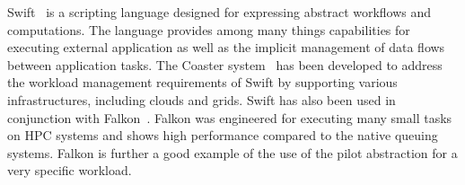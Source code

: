 \documentclass{sig-alternate}
\begin{document}
Swift~\cite{Wilde2011} is a scripting language designed for expressing
abstract workflows and computations.
The language provides among many things capabilities for executing external
application as well as the implicit management of data flows between
application tasks.
The Coaster system~\cite{coasters} has been developed to address the workload
management requirements of Swift by supporting various infrastructures,
including clouds and grids.
Swift has also been used in conjunction with Falkon~\cite{1362680}.
Falkon was engineered for executing many small tasks on HPC systems and shows
high performance compared to the native queuing systems.
Falkon is further a good example of the use of the pilot abstraction for a very
specific workload.
\end{document}
